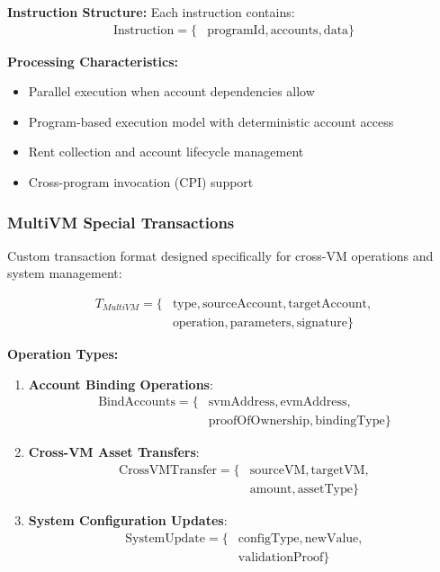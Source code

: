\documentclass[11pt,a4paper]{article}
\begin{document}
\textbf{Instruction Structure:}
Each instruction contains:
\begin{align}
\text{Instruction} = \{&\text{programId}, \text{accounts}, \text{data}\}
\end{align}

\textbf{Processing Characteristics:}
\begin{itemize}
    \item Parallel execution when account dependencies allow
    \item Program-based execution model with deterministic account access
    \item Rent collection and account lifecycle management
    \item Cross-program invocation (CPI) support
\end{itemize}

\subsubsection{MultiVM Special Transactions}
Custom transaction format designed specifically for cross-VM operations and system management:

\begin{align}
T_{MultiVM} = \{&\text{type}, \text{sourceAccount}, \text{targetAccount}, \\
                &\text{operation}, \text{parameters}, \text{signature}\}
\end{align}

\textbf{Operation Types:}
\begin{enumerate}
    \item \textbf{Account Binding Operations}:
    \begin{align}
    \text{BindAccounts} = \{&\text{svmAddress}, \text{evmAddress}, \\
                            &\text{proofOfOwnership}, \text{bindingType}\}
    \end{align}
    
    \item \textbf{Cross-VM Asset Transfers}:
    \begin{align}
    \text{CrossVMTransfer} = \{&\text{sourceVM}, \text{targetVM}, \\
                               &\text{amount}, \text{assetType}\}
    \end{align}
    
    \item \textbf{System Configuration Updates}:
    \begin{align}
    \text{SystemUpdate} = \{&\text{configType}, \text{newValue}, \\
                            &\text{validationProof}\}
    \end{align}
\end{enumerate}
\end{document}
